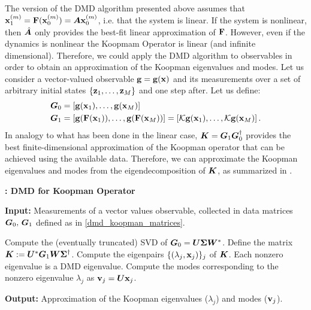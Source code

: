 The version of the DMD algorithm presented above assumes that $\vb{x}_1^{(m)} = \vb{F}(\vb{x}_0^{(m)}) =  \vb*{A}\vb{x}_0^{(m)}$, i.e. that the system is linear. If the system is nonlinear, then $\hat{\vb*{A}}$ only provides the best-fit linear approximation of $\vb{F}$. However, even if the dynamics is nonlinear the Koopmam Operator is linear (and infinite dimensional). Therefore, we could apply the DMD algorithm to observables in order to obtain an approximation of the Koopman eigenvalues and modes. Let us consider a vector-valued observable $\vb{g} = \vb{g}(\vb{x})$ and its measurements over a set of arbitrary initial states $\{\vb{z}_1,\dots, \vb{z}_M\}$ and one step after. Let us define:
\begin{equation}
    \label{dmd_koopman_matrices}
    \begin{split}
        \vb*{G}_0 &= \left[\vb{g}(\vb{x}_1), \dots, \vb{g}(\vb{x}_M)\right] \\
        \vb*{G}_1 &= \left[\vb{g}(\vb{F}(\vb{x}_1)), \dots, \vb{g}(\vb{F}(\vb{x}_M))\right] = \left[\mathcal{K}\vb{g}(\vb{x}_1), \dots, \mathcal{K}\vb{g}(\vb{x}_M)\right].\\
    \end{split}
\end{equation}
In analogy to what has been done in the linear case, $\vb*{K} = \vb*{G}_1\vb*{G}_0^{\dagger}$ provides the best finite-dimensional approximation of the Koopman operator that can be achieved using the available data. Therefore, we can approximate the Koopman eigenvalues and modes from the eigendecomposition of $\vb*{K}$, as summarized in .

\begin{algorithm}[h]
\caption{\textbf{: DMD for Koopman Operator}}
\label{alg_koopman_dmd}
\textbf{Input:} Measurements of a vector values observable, collected in data matrices $\vb*{G}_0,\,\vb*{G}_1$ defined as in \eqref{dmd_koopman_matrices}.
\begin{algorithmic}[1]
\State Compute the (eventually truncated) SVD of $\vb*{G}_0 = \vb*{U}\vb*{\Sigma}\vb*{W}^*$.
\State Define the matrix $\vb*{K} := \vb*{U}^*\vb*{G}_1\vb*{W}\vb*{\Sigma}^{\dagger}$.
\State Compute the eigenpairs $\{(\lambda_j, \vb{x}_j)\}_j$ of $\vb*{K}$. Each nonzero eigenvalue is a DMD eigenvalue.
\State Compute the modes corresponding to the nonzero eigenvalue $\lambda_j$ as $\vb{v}_j = \vb*{U}\vb{x}_j$. 
\end{algorithmic}
\textbf{Output:} Approximation of the Koopman eigenvalues ($\lambda_j$) and modes ($\vb{v}_j$).
\end{algorithm}

